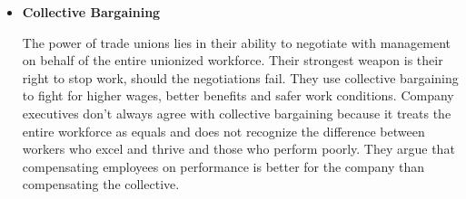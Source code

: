 \begin{itemize}
\item \textbf{Collective Bargaining}

The power of trade unions lies in their ability to negotiate with management on behalf of the entire unionized workforce. Their strongest weapon is their right to stop work, should the negotiations fail. They use collective bargaining to fight for higher wages, better benefits and safer work conditions. Company executives don't always agree with collective bargaining because it treats the entire workforce as equals and does not recognize the difference between workers who excel and thrive and those who perform poorly. They argue that compensating employees on performance is better for the company than compensating the collective.


\end{itemize}







